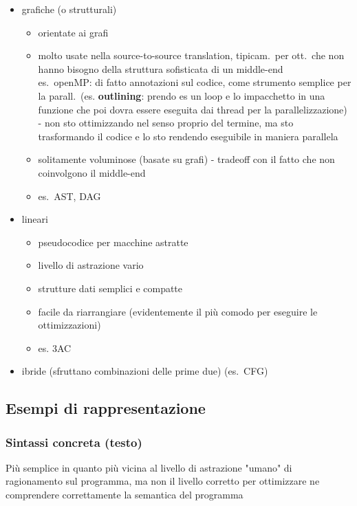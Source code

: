 \begin{itemize}
  \item grafiche (o strutturali)
    \begin{itemize}
      \item orientate ai grafi
      \item molto usate nella source-to-source translation, tipicam.~per ott.~che non hanno bisogno della struttura sofisticata di un middle-end\\
      es.~openMP: di fatto annotazioni sul codice, come strumento semplice per la parall.~(es. \textbf{outlining}: prendo es un loop e lo impacchetto in una funzione che poi dovra essere eseguita dai thread per la parallelizzazione) - non sto ottimizzando nel senso proprio del termine, ma sto trasformando il codice e lo sto rendendo eseguibile in maniera parallela
      \item solitamente voluminose (basate su grafi) - tradeoff con il fatto che non coinvolgono il middle-end
      \item es.~AST, DAG
    \end{itemize}
  \item lineari
    \begin{itemize}
      \item pseudocodice per macchine astratte
      \item livello di astrazione vario
      \item strutture dati semplici e compatte
      \item facile da riarrangiare (evidentemente il pi\`u comodo per eseguire le ottimizzazioni)
      \item es. 3AC
    \end{itemize}
  \item ibride (sfruttano combinazioni delle prime due) (es.~CFG)
\end{itemize}
\subsection{Esempi di rappresentazione}


\subsubsection{Sintassi concreta (testo)}

Pi\`u semplice in quanto pi\`u vicina al livello di astrazione "umano" di ragionamento sul programma, ma non il livello corretto per ottimizzare ne comprendere correttamente la semantica del programma

